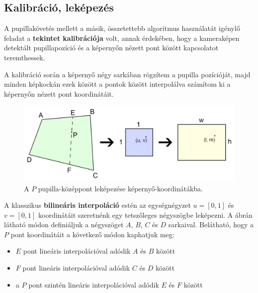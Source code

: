 \subsection{Kalibráció, leképezés}\label{sect:kalibracio}

A pupillakövetés mellett a másik, összetettebb algoritmus használatát igénylő feladat a \textbf{tekintet kalibrációja} volt, annak érdekében, hogy a kameraképen detektált pupillapozíció és a képernyőn nézett pont között kapcsolatot teremthessek.

A kalibráció során a képernyő négy sarkában rögzítem a pupilla pozícióját, majd minden képkockán ezek között a pontok között interpolálva számítom ki a képernyőn nézett pont koordinátáit.

\bigskip

\begin{figure}[!ht]
\centering
\includegraphics[width=140mm, keepaspectratio]{figures/interpol.png}
\caption{A $P$ pupilla-középpont leképezése képernyő-koordinátákba.}
\label{fig:interpol}
\end{figure}

A klasszikus \textbf{bilineáris interpoláció} estén az egységnégyzet $u = [0, 1]$ és $v = [0, 1]$ koordinátáit szeretnénk egy tetszőleges négyszögbe leképezni. A  ábrán látható módon definiáljuk a négyszöget $A$, $B$, $C$ és $D$ sarkaival. Belátható, hogy a $P$ pont koordinátáit a következő módon kaphatjuk meg:

\begin{itemize}
  \item $E$ pont lineáris interpolációval adódik $A$ és $B$ között
  \item $F$ pont lineáris interpolációval adódik $C$ és $D$ között
  \item a $P$ pont szintén lineáris interpolációval adódik $E$ és $F$ között
\end{itemize}


